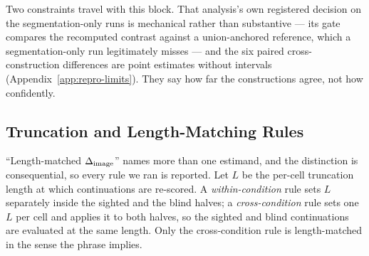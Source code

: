 Two constraints travel with this block. That analysis's own registered decision on the segmentation-only runs is
mechanical rather than substantive --- its gate compares the recomputed contrast against a
union-anchored reference, which a segmentation-only run legitimately misses --- and the six paired
cross-construction differences are point estimates without intervals
(Appendix~\ref{app:repro-limits}). They say how far the constructions agree, not how confidently.

\subsection{Truncation and Length-Matching Rules}
\label{app:trunc}

``Length-matched $\Delta_{\mathrm{image}}$'' names more than one estimand, and the distinction is consequential, so
every rule we ran is reported. Let $L$ be the per-cell truncation length at which continuations are
re-scored. A \emph{within-condition} rule sets $L$ separately inside the sighted and the blind halves;
a \emph{cross-condition} rule sets one $L$ per cell and applies it to both halves, so the sighted and
blind continuations are evaluated at the same length. Only the cross-condition rule is length-matched
in the sense the phrase implies.

